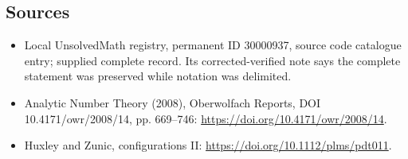 \documentclass[11pt]{article}
\begin{document}
\subsection{Sources}
\begin{itemize}
\item Local UnsolvedMath registry, permanent ID 30000937, source code catalogue entry; supplied complete record. Its corrected-verified note says the complete statement was preserved while notation was delimited.
\item Analytic Number Theory (2008), Oberwolfach Reports, DOI 10.4171/owr/2008/14, pp. 669--746: \url{https://doi.org/10.4171/owr/2008/14}.
\item Huxley and Zunic, configurations II: \url{https://doi.org/10.1112/plms/pdt011}.
\end{itemize}
\end{document}
